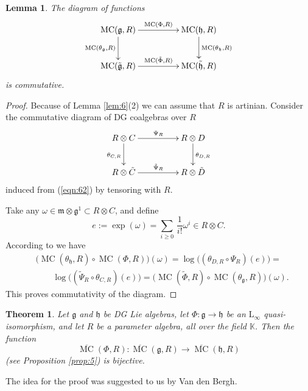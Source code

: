 \documentclass[a4paper,10pt]{amsart}
\newtheorem{thm}[equation]{Theorem}
\newtheorem{lem}[equation]{Lemma}
\theoremstyle{definition}
\numberwithin{equation}{section}
\newcommand{\opn}{\operatorname}
\newcommand{\ol}{\overline}
\newcommand{\mfrak}[1]{\mathfrak{#1}}
\newcommand{\mrm}[1]{\mathrm{#1}}
\newcommand{\mbb}[1]{\mathbb{#1}}
\newcommand{\smfrac}[2]{\textstyle \frac{#1}{#2}}
\newcommand{\tup}[1]{\textup{#1}}
\newcommand{\ot}{\otimes}
\newcommand{\til}[1]{\tilde{#1}}
\newcommand{\K}{\mbb{K}}
\newcommand{\g}{\mfrak{g}}
\newcommand{\m}{\mfrak{m}}
\newcommand{\h}{\mfrak{h}}
\newcommand{\om}{\omega}
\renewcommand{\th}{\theta}
\begin{document}
\begin{lem} \label{lem:18}
The diagram of functions
\begin{equation} \label{eqn:65}
\UseTips \xymatrix @C=11ex @R=6ex {
\opn{MC}(\g, R)
\ar[r]^{\opn{MC}(\Phi, R)}
\ar[d]_{\opn{MC}(\th_{\g}, R)}
&
\opn{MC}(\h, R)
\ar[d]^{\opn{MC}(\th_{\h}, R)}
\\
\opn{MC}(\til{\g}, R)
\ar[r]^{\opn{MC}(\til{\Phi}, R)}
&
\opn{MC}(\til{\h}, R)
} 
\end{equation}
is commutative.
\end{lem}

\begin{proof}
Because of Lemma \ref{lem:6}(2) we can assume that $R$ is artinian.
Consider the commutative diagram of DG coalgebras over $R$
\begin{equation} \label{eqn:67}
\UseTips \xymatrix @C=11ex @R=6ex {
R \ot C
\ar[r]^{\Psi_R}
\ar[d]_{\th_{C, R}}
&
R \ot D
\ar[d]^{\th_{D, R}}
\\
R \ot \til{C}
\ar[r]^{\til{\Psi}_R}
&
R \ot \til{D}
} 
\end{equation}
induced from (\ref{eqn:62}) by tensoring with $R$. 

Take any $\om \in \m \ot \g^1 \subset R \ot C$, and define 
\[ e := \exp(\om) = \sum_{i \geq 0} \, \smfrac{1}{i!} \om^i \in R \ot C . \]
According to \cite[Lemma 3.18]{Ye2} we have
\[ \begin{aligned}
& \bigl( \opn{MC}(\th_{\h}, R) \circ \opn{MC}(\Phi, R) \bigr)(\om) =
\log \bigl( (\th_{D, R} \circ \Psi_R)(e) \bigr) = \\
& \qquad \log \bigl( (\til{\Psi}_R \circ \th_{C, R})(e) \bigr) =
\bigl( \opn{MC}(\til{\Phi}, R) \circ \opn{MC}(\th_{\g}, R) \bigr)(\om) . 
\end{aligned} \]
This proves commutativity of the diagram.
\end{proof}



\begin{thm} \label{thm:3}
Let $\g$ and $\h$ be DG Lie algebras, 
let $\Phi : \g \to \h$ be an $\mrm{L}_{\infty}$ quasi-isomorphism, and
let $R$ be a parameter algebra, all over the field $\K$. 
Then the function 
\[ \ol{\opn{MC}}(\Phi, R) : \ol{\opn{MC}}(\g, R) \to 
\ol{\opn{MC}}(\h, R) \]
\tup{(}see Proposition \tup{\ref{prop:5})} is bijective. 
\end{thm}

The idea for the proof was suggested to us by Van den Bergh.
\end{document}
